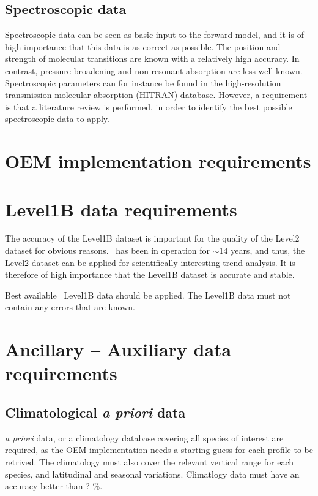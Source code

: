 \subsection{Spectroscopic data}

Spectroscopic data can be seen as basic input to the forward model,  
and it is of high importance that this data is as correct as possible. 
The position and strength of molecular transitions 
are known with a relatively high accuracy. In contrast, pressure 
broadening and non-resonant absorption are less well known.
Spectroscopic parameters can for instance be found in the 
high-resolution transmission molecular absorption (HITRAN) database.
However, a requirement is that a literature review is performed,
in order to identify the best possible spectroscopic data to apply. 



\section{OEM implementation requirements}


\section{Level1B data requirements}

The accuracy of the Level1B dataset is important for the quality of the
Level2 dataset for obvious reasons. \smr\ has been in operation
for \(\sim\)14 years, and thus, the Level2 dataset can be applied for
scientifically interesting trend analysis. It is therefore of
high importance that the Level1B dataset is accurate and stable.

Best available \smr\ Level1B data should be applied.
The Level1B data must not contain any errors that are known.


\section{Ancillary -- Auxiliary data requirements}
\subsection{Climatological \textit{a priori} data}
\textit{a priori} data, or a climatology database covering all species of interest
are required, as the OEM implementation needs a starting guess for each profile
to be retrived. 
The climatology must also cover the relevant vertical range for each species, and
latitudinal and seasonal variations.
Climatlogy data must have an accuracy better than ? \(\%\).

